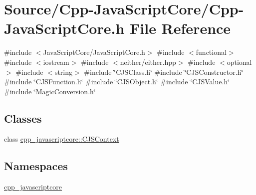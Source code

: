 \hypertarget{_cpp-_java_script_core_8h}{}\section{Source/\+Cpp-\/\+Java\+Script\+Core/\+Cpp-\/\+Java\+Script\+Core.h File Reference}
\label{_cpp-_java_script_core_8h}
{\ttfamily \#include $<$Java\+Script\+Core/\+Java\+Script\+Core.\+h$>$}\newline
{\ttfamily \#include $<$functional$>$}\newline
{\ttfamily \#include $<$iostream$>$}\newline
{\ttfamily \#include $<$neither/either.\+hpp$>$}\newline
{\ttfamily \#include $<$optional$>$}\newline
{\ttfamily \#include $<$string$>$}\newline
{\ttfamily \#include \char`\"{}C\+J\+S\+Class.\+h\char`\"{}}\newline
{\ttfamily \#include \char`\"{}C\+J\+S\+Constructor.\+h\char`\"{}}\newline
{\ttfamily \#include \char`\"{}C\+J\+S\+Function.\+h\char`\"{}}\newline
{\ttfamily \#include \char`\"{}C\+J\+S\+Object.\+h\char`\"{}}\newline
{\ttfamily \#include \char`\"{}C\+J\+S\+Value.\+h\char`\"{}}\newline
{\ttfamily \#include \char`\"{}Magic\+Conversion.\+h\char`\"{}}\newline
\subsection*{Classes}
\begin{DoxyCompactItemize}
\item 
class \mbox{\hyperlink{classcpp__javascriptcore_1_1_c_j_s_context}{cpp\+\_\+javascriptcore\+::\+C\+J\+S\+Context}}
\end{DoxyCompactItemize}
\subsection*{Namespaces}
\begin{DoxyCompactItemize}
\item 
 \mbox{\hyperlink{namespacecpp__javascriptcore}{cpp\+\_\+javascriptcore}}
\end{DoxyCompactItemize}
